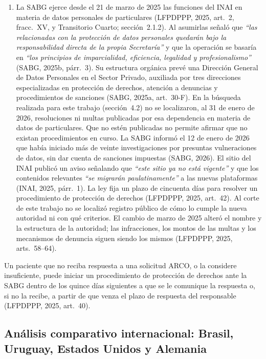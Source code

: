 \documentclass[12pt, a4paper]{article}
\begin{document}
\begin{enumerate}[label=\Roman*.]
  \item La SABG ejerce desde el 21 de marzo de 2025 las funciones del INAI en
  materia de datos personales de particulares (LFPDPPP, 2025,
  art.~2, fracc.~XV, y Transitorio Cuarto; sección~2.1.2). Al asumirlas señaló que \textit{``las relacionadas con la protección de
  datos personales quedarán bajo la responsabilidad directa de la
  propia Secretaría''} y que la operación se basaría en
  \textit{``los principios de imparcialidad, eficiencia, legalidad
  y profesionalismo''} (SABG, 2025b, párr.~3). Su estructura orgánica prevé una
  Dirección General de Datos Personales en el Sector Privado,
  auxiliada por tres direcciones especializadas en protección de
  derechos, atención a denuncias y procedimientos de sanciones
  (SABG, 2025a, art.~30\mbox{-}F). En la búsqueda realizada para este
  trabajo (sección~4.2) no se localizaron, al 31 de enero de 2026,
  resoluciones ni multas publicadas por esa dependencia en materia de
  datos de particulares. Que no estén publicadas no permite afirmar que no
  existan procedimientos en curso. La SABG
  informó el 12 de enero de 2026 que había iniciado más de veinte
  investigaciones por presuntas vulneraciones de datos, sin dar cuenta
  de sanciones impuestas (SABG, 2026). El
  sitio del INAI publicó un aviso señalando que \textit{``este sitio
  ya no está vigente''} y que los contenidos relevantes \textit{``se
  migrarán paulatinamente''} a las nuevas plataformas (INAI, 2025,
  párr.~1). La ley fija un plazo de cincuenta días para resolver un
  procedimiento de protección de derechos (LFPDPPP, 2025, art.~42).
  Al corte de este trabajo no se localizó registro público de cómo
  lo cumple la nueva autoridad ni con qué criterios. El cambio de
  marzo de 2025 alteró el nombre y la estructura de la autoridad;
  las infracciones, los montos de las multas y los mecanismos de
  denuncia siguen siendo los mismos (LFPDPPP, 2025, arts.~58--64).
\end{enumerate}
 
  Un paciente que no reciba respuesta a una solicitud ARCO, o la
  considere insuficiente, puede iniciar un procedimiento de
  protección de derechos ante la SABG dentro de los quince días
  siguientes a que se le comunique la respuesta o, si no la recibe, a partir de que venza el plazo de respuesta del responsable (LFPDPPP, 2025, art.~40).
 
\subsection{Análisis comparativo internacional: Brasil, Uruguay,
Estados Unidos y Alemania}
\end{document}
